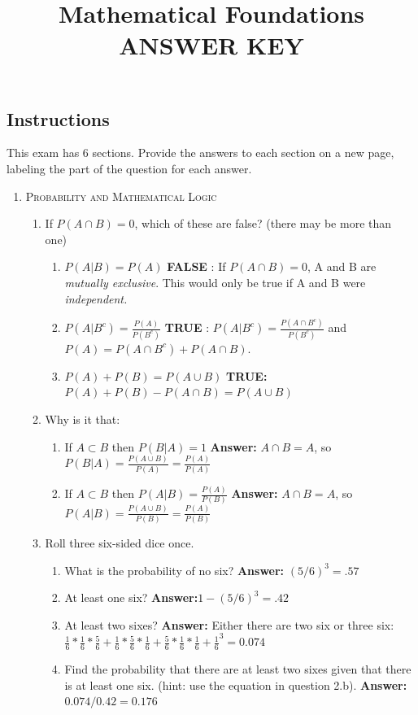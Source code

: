 \documentclass[11pt,letterpaper]{article}
\title{Mathematical Foundations ANSWER KEY}
\numberwithin{equation}{section}
\begin{document}
\maketitle
\subsection*{Instructions}
This exam has 6 sections.  Provide the answers to each section on a new page, labeling the part of the question for each answer.  
\begin{enumerate}[I]
\item \textsc{Probability and Mathematical Logic }
\begin{enumerate}[1)]
\item If $P(A\cap B)=0$, which of these are false? (there may be more than one)
\begin{enumerate}
\item[a)] $P(A|B)=P(A)$ \textbf{FALSE} : If $P(A\cap B)=0$, A and B are \emph{mutually exclusive}.  This would only be true if A and B were \emph{independent.}
\item[b)] $P(A|B^c)=\frac{P(A)}{P(B^c)}$ \textbf{TRUE} :  $P(A|B^c)=\frac{P(A\cap B^c)}{P(B^c)}$ and $P(A)=P(A\cap B^c)+P(A\cap B)$.
\item[c)] $P(A)+P(B)=P(A\cup B)$ \textbf{TRUE:} $P(A)+P(B)-P(A\cap B)=P(A\cup B)$
\end{enumerate}
\item  Why is it that: 
\begin{enumerate}
\item[a)] If $A \subset B$ then $P(B|A) = 1$ \textbf{Answer:} $A\cap B=A$, so $P(B|A) = \frac{P(A\cup B)}{P(A)}=\frac{P(A)}{P(A)}$
\item[b)] If $A \subset B$ then $P(A|B) = \frac{P(A)}{P(B)}$ \textbf{Answer:} $A\cap B=A$, so $P(A|B) = \frac{P(A\cup B)}{P(B)}=\frac{P(A)}{P(B)}$
\end{enumerate}
\item Roll three six-sided dice once. 
\begin{enumerate}
\item[a)] What is the probability of no six?  \textbf{Answer:} $(5/6)^3=.57$
\item[] At least one six?  \textbf{Answer:}$1 - (5/6)^3= .42$
\item[] At least two sixes? \textbf{Answer:} Either there are two six or three six: $\frac{1}{6}*\frac{1}{6}*\frac{5}{6}+\frac{1}{6}*\frac{5}{6}*\frac{1}{6}+\frac{5}{6}*\frac{1}{6}*\frac{1}{6}+\frac{1}{6}^3=0.074$
\item[b)] Find the probability that there are at least two sixes given that there is at least one six. (hint: use the equation in question 2.b). \textbf{Answer:} $0.074/0.42 = 0.176$

\end{enumerate}
\end{enumerate}
\end{enumerate}
\end{document}
